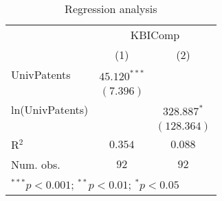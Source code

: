
\begin{table}
\begin{center}
\begin{tabular}{l c c}
\hline
 & \multicolumn{2}{c}{KBIComp} \\
\cline{2-3}
 & (1) & (2) \\
\hline
UnivPatents     & $45.120^{***}$ &               \\
                & $(7.396)$      &               \\
ln(UnivPatents) &                & $328.887^{*}$ \\
                &                & $(128.364)$   \\
\hline
R$^2$           & $0.354$        & $0.088$       \\
Num. obs.       & $92$           & $92$          \\
\hline
\multicolumn{3}{l}{\scriptsize{$^{***}p<0.001$; $^{**}p<0.01$; $^{*}p<0.05$}}
\end{tabular}
\caption{Regression analysis}
\label{table:coefficients}
\end{center}
\end{table}

